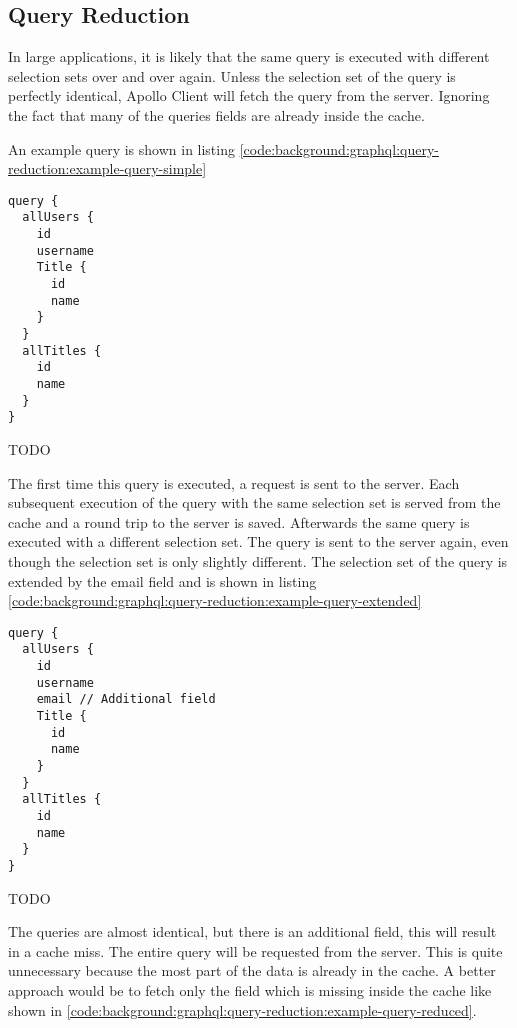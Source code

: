 \subsection{Query Reduction}

In large applications, it is likely that the same query is executed with different selection sets over and over again. Unless the selection set of the query is perfectly identical, Apollo Client will fetch the query from the server. Ignoring the fact that many of the queries fields are already inside the cache.

An example query is shown in listing \ref{code:background:graphql:query-reduction:example-query-simple}

\ifshowListings
\begin{listing}[H]
\begin{verbatim}
query {
  allUsers {
    id
    username
    Title {
      id
      name
    }
  }
  allTitles {
    id
    name
  }
}
\end{verbatim}
\caption{TODO}\label{code:background:graphql:query-reduction:example-query-simple}
\end{listing}
\fi

The first time this query is executed, a request is sent to the server. Each subsequent execution of the query with the same selection set is served from the cache and a round trip to the server is saved. Afterwards the same query is executed with a different selection set. The query is sent to the server again, even though the selection set is only slightly different. The selection set of the query is extended by the email field and is shown in listing \ref{code:background:graphql:query-reduction:example-query-extended}

\ifshowListings
\begin{listing}[H]
\begin{verbatim}
query {
  allUsers {
    id
    username
    email // Additional field
    Title {
      id
      name
    }
  }
  allTitles {
    id
    name
  }
}
\end{verbatim}
\caption{TODO}\label{code:background:graphql:query-reduction:example-query-extended}
\end{listing}
\fi

The queries are almost identical, but there is an additional field, this will result in a cache miss. The entire query will be requested from the server. This is quite unnecessary because the most part of the data is already in the cache. A better approach would be to fetch only the field which is missing inside the cache like shown in \ref{code:background:graphql:query-reduction:example-query-reduced}.

